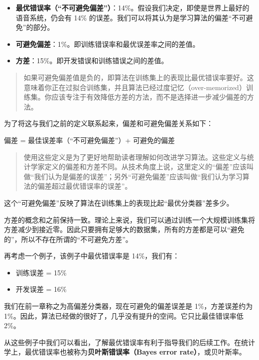 \begin{itemize}
\tightlist
\item
  \textbf{最优错误率（``不可避免偏差''）}：14\%。假设我们决定，即使是世界上最好的语音系统，仍会有
  14\% 的误差。我们可以将其认为是学习算法的偏差``不可避免''的部分。
\item
  \textbf{可避免偏差}：1\%。即训练错误率和最优误差率之间的差值。
\item
  \textbf{方差}：15\%。即开发错误和训练错误之间的差值。
\end{itemize}

\begin{quote}
如果可避免偏差值是负的，即算法在训练集上的表现比最优错误率要好。这意味着你正在过拟合训练集，并且算法已经过度记忆（over-memorized）训练集。你应该专注于有效降低方差的方法，而不是选择进一步减少偏差的方法。
\end{quote}

为了将这与我们之前的定义联系起来，偏差和可避免偏差关系如下：

偏差 = 最佳误差率（``不可避免偏差''）+ 可避免的偏差

\begin{quote}
使用这些定义是为了更好地帮助读者理解如何改进学习算法。这些定义与统计学家定义的偏差和方差不同。从技术角度上说，这里定义的``偏差''应该叫做``我们认为是偏差的误差''；另外``可避免偏差''应该叫做``我们认为学习算法的偏差超过最优错误率的误差''。
\end{quote}

这个``可避免偏差''反映了算法在训练集上的表现比起``最优分类器''差多少。

方差的概念和之前保持一致。理论上来说，我们可以通过训练一个大规模训练集将方差减少到接近零。因此只要拥有足够大的数据集，所有的方差都是可以``避免的''，所以不存在所谓的``不可避免方差''。

再考虑一个例子，该例子中最优错误率是 14\%，我们有：

\begin{itemize}
\tightlist
\item
  训练误差 = 15\%
\item
  开发误差 = 16\%
\end{itemize}

我们在前一章称之为高偏差分类器，现在可避免的偏差误差是 1\%，方差误差约为
1\%。因此，算法已经做的很好了，几乎没有提升的空间。它只比最佳错误率低
2\%。

从这些例子中我们可以看出，了解最优错误率有利于指导我们的后续工作。在统计学上，最优错误率也被称为\textbf{贝叶斯错误率（Bayes
error rate）}，或贝叶斯率。

